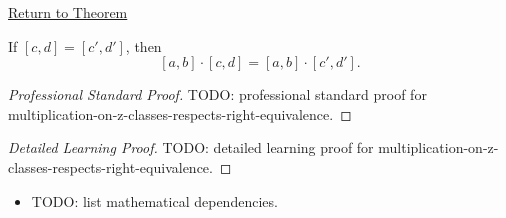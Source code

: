 \newpage
{}
\label{prf:multiplication-on-z-classes-respects-right-equivalence}

\begin{remark*}[Return]
\hyperref[lem:multiplication-on-z-classes-respects-right-equivalence]{Return to Theorem}
\end{remark*}

\begin{lemma*}
If $[c,d]=[c',d']$, then
\[
[a,b]\cdot[c,d]=[a,b]\cdot[c',d'].
\]
\end{lemma*}

\begin{proof}[Professional Standard Proof]
\LRAProofBodyStart
TODO: professional standard proof for multiplication-on-z-classes-respects-right-equivalence.
\end{proof}

\begin{proof}[Detailed Learning Proof]
\LRAProofBodyStart
TODO: detailed learning proof for multiplication-on-z-classes-respects-right-equivalence.
\end{proof}

\begin{remark*}
\end{remark*}

\begin{dependencies}
\begin{itemize}
  \item TODO: list mathematical dependencies.
\end{itemize}
\end{dependencies}

\clearpage
